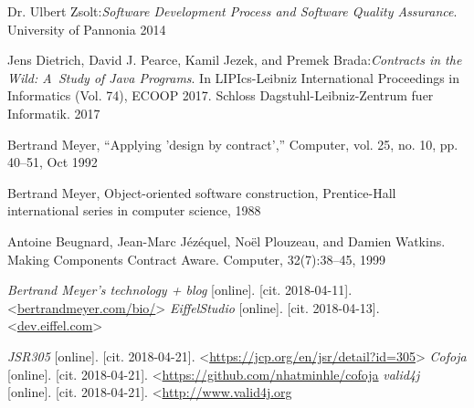 \begin{thebibliography}{99}

 Dr. Ulbert Zsolt:\emph{Software Development Process and Software Quality Assurance}. University of Pannonia 2014


 Jens Dietrich, David J. Pearce, Kamil Jezek, and Premek Brada:\emph{Contracts in the Wild: A~Study of Java Programs}. In LIPIcs-Leibniz International Proceedings in Informatics (Vol. 74), ECOOP 2017. Schloss Dagstuhl-Leibniz-Zentrum fuer Informatik. 2017

 Bertrand Meyer, “Applying ’design by contract’,” Computer, vol. 25, no. 10, pp. 40–51, Oct 1992

 Bertrand Meyer, Object-oriented software construction, Prentice-Hall international series in computer science, 1988 

 Antoine Beugnard, Jean-Marc Jézéquel, Noël Plouzeau, and Damien Watkins. Making Components Contract Aware. Computer, 32(7):38–45, 1999


 {\it Bertrand Meyer's technology + blog} [online]. [cit. 2018-04-11]. \textless\url{bertrandmeyer.com/bio/}\textgreater
{} {\it EiffelStudio} [online]. [cit. 2018-04-13]. \textless\url{dev.eiffel.com}\textgreater

 {\it JSR305} [online]. [cit. 2018-04-21]. \textless\url{https://jcp.org/en/jsr/detail?id=305}\textgreater
{} {\it Cofoja} [online]. [cit. 2018-04-21]. \textless\url{https://github.com/nhatminhle/cofoja}
 {\it valid4j} [online]. [cit. 2018-04-21]. \textless\url{http://www.valid4j.org}	


\end{thebibliography}
